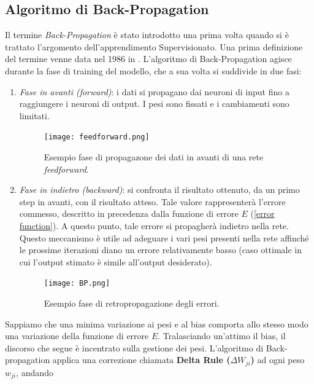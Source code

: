 \subsection{Algoritmo di Back-Propagation}\label{BP}
Il termine \emph{Back-Propagation} è stato introdotto una prima volta quando si è 
trattato l'argomento dell'apprendimento Supervisionato. Una prima definizione 
del termine venne data nel 1986 in \cite{03}. L'algoritmo di Back-Propagation agisce 
durante la fase di training del modello, che a sua volta si suddivide in due fasi:
\begin{enumerate}
    \item \emph{Fase in avanti (forward)}: i dati si propagano dai neuroni di input fino 
    a raggiungere i neuroni di output. I pesi sono fissati e i cambiamenti sono 
    limitati.
    \begin{figure}
        \centering
        \texttt{[image: feedforward.png]}
        \centering
        \caption{Esempio fase di propagazone dei dati in avanti di una rete \emph{feedforward}.}
        \label{feedforward net}
    \end{figure}
    \item \emph{Fase in indietro (backward)}:  si confronta il risultato ottenuto, da un primo 
    step in avanti, con il risultato atteso. Tale valore rappresenterà l'errore 
    commesso, descritto in precedenza dalla funzione di errore $E$ (\ref{error function}). A questo 
    punto, tale errore si propagherà indietro nella rete. Questo meccanismo è 
    utile ad adeguare i vari pesi presenti nella rete affinché le prossime iterazioni 
    diano un errore relativamente basso (caso ottimale in cui l'output stimato è 
    simile all'output desiderato).
    \begin{figure}
        \centering
        \texttt{[image: BP.png]}
        \centering
        \caption{Esempio fase di retropropagazione degli errori.}
        \label{BP error}
    \end{figure}
\end{enumerate}
Sappiamo che una minima variazione ai pesi e al bias comporta allo stesso modo 
una variazione della funzione di errore $E$. Tralasciando un'attimo il bias, il discorso 
che segue è incentrato sulla gestione dei pesi. L'algoritmo di Back-propagation 
applica una correzione chiamata {\bfseries{Delta Rule ($\Delta{W_{ji}}$)}}  ad ogni peso $w_{ji}$, andando 
